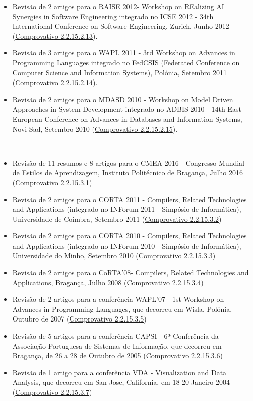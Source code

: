 \documentclass[11pt]{article}
\begin{document}
\begin{itemize}
\item {Revisão de 2 artigos para o RAISE 2012- Workshop on REalizing AI Synergies in Software Engineering integrado no ICSE 2012 - 34th International Conference on Software Engineering, Zurich, Junho 2012 (\href{run:ComprovativosCOCP/revisoes/RAISE2012.pdf}{Comprovativo 2.2.15.2.13}).}
\item {Revisão de 3 artigos para o WAPL 2011 - 3rd Workshop on Advances in Programming Languages integrado no FedCSIS (Federated Conference on Computer Science and Information Systems), Polónia, Setembro 2011 (\href{run:ComprovativosCOCP/revisoes/WAPL2011.pdf}{Comprovativo 2.2.15.2.14}).}
\item {Revisão de 2 artigos para o MDASD 2010 - Workshop on Model Driven Approaches in System Development integrado no ADBIS 2010 - 14th East-European Conference on Advances in Databases and Information Systems, Novi Sad, Setembro 2010 (\href{run:ComprovativosCOCP/revisoes/MDASD2010.pdf}{Comprovativo 2.2.15.2.15}).}
\end{itemize}

\\
\begin{itemize}
\item {Revisão de 11 resumos e 8 artigos para o CMEA 2016 - Congresso Mundial de Estilos de Aprendizagem, Instituto Politécnico de Bragança, Julho 2016 (\href{run:ComprovativosCOCP/revisoes/CMEA2016.pdf}{Comprovativo 2.2.15.3.1})}
\item {Revisão de 2 artigos para o CORTA 2011 - Compilers, Related Technologies and Applications (integrado no INForum 2011 - Simpósio de Informática), Universidade de Coimbra, Setembro 2011 (\href{run:ComprovativosCOCP/revisoes/CORTA2011.pdf}{Comprovativo 2.2.15.3.2})}
\item {Revisão de 2 artigos para o CORTA 2010 - Compilers, Related Technologies and Applications (integrado no INForum 2010 - Simpósio de Informática), Universidade do Minho, Setembro 2010 (\href{run:ComprovativosCOCP/revisoes/CORTA2010.pdf}{Comprovativo 2.2.15.3.3})}
\item {Revisão de 2 artigos para o CoRTA'08- Compilers, Related Technologies and Applications, Bragança, Julho 2008 (\href{run:ComprovativosCOCP/revisoes/CORTA2008.pdf}{Comprovativo 2.2.15.3.4})}
\item {Revisão de 2 artigos para a conferência WAPL'07 - 1st Workshop on Advances in Programming Languages, que decorreu em Wisla, Polónia, Outubro de 2007 (\href{run:ComprovativosCOCP/revisoes/WAPL2007.pdf}{Comprovativo 2.2.15.3.5})}
\item {Revisão de 5 artigos para a conferência CAPSI - 6ª Conferência da Associação Portuguesa de Sistemas de Informação, que decorreu em Bragança, de 26 a 28 de Outubro de 2005 (\href{run:ComprovativosCOCP/revisoes/CAPSI2005.pdf}{Compro{}vativo 2.2.15.3.6})}
\item {Revisão de 1 artigo para a conferência VDA - Visualization and Data Analysis, que decorreu em San Jose, California, em 18-20 Janeiro 2004 (\href{run:ComprovativosCOCP/revisoes/VDA2004.pdf}{Comprovativo 2.2.15.3.7})}
\end{itemize}
\end{document}
